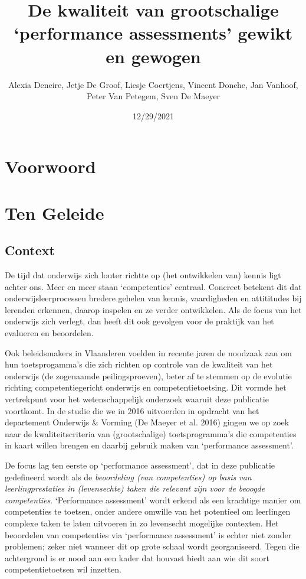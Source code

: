 \documentclass[
  letterpaper,
]{report}
\title{De kwaliteit van grootschalige `performance assessments' gewikt
en gewogen}
\author{Alexia Deneire, Jetje De Groof, Liesje Coertjens, Vincent
Donche, Jan Vanhoof, Peter Van Petegem, Sven De Maeyer}
\date{12/29/2021}
\begin{document}
\maketitle

\renewcommand*\contentsname{Inhoud hoofdstuk}
{
\hypersetup{linkcolor=}
\setcounter{tocdepth}{2}
\tableofcontents
}
\listoffigures
\listoftables
\hypertarget{voorwoord}{%
\chapter*{Voorwoord}\label{voorwoord}}

\hypertarget{ten-geleide}{%
\chapter{Ten Geleide}\label{ten-geleide}}

\hypertarget{context}{%
\section{Context}\label{context}}

De tijd dat onderwijs zich louter richtte op (het ontwikkelen van)
kennis ligt achter ons. Meer en meer staan `competenties' centraal.
Concreet betekent dit dat onderwijsleerprocessen bredere gehelen van
kennis, vaardigheden en attititudes bij lerenden erkennen, daarop
inspelen en ze verder ontwikkelen. Als de focus van het onderwijs zich
verlegt, dan heeft dit ook gevolgen voor de praktijk van het evalueren
en beoordelen.

Ook beleidsmakers in Vlaanderen voelden in recente jaren de noodzaak aan
om hun toetsprogamma's die zich richten op controle van de kwaliteit van
het onderwijs (de zogenaamde peilingsproeven), beter af te stemmen op de
evolutie richting competentiegericht onderwijs en competentietoetsing.
Dit vormde het vertrekpunt voor het wetenschappelijk onderzoek waaruit
deze publicatie voortkomt. In de studie die we in 2016 uitvoerden in
opdracht van het departement Onderwijs \& Vorming (De Maeyer et al.
2016) gingen we op zoek naar de kwaliteitscriteria van (grootschalige)
toetsprogramma's die competenties in kaart willen brengen en daarbij
gebruik maken van `performance assessment'.

De focus lag ten eerste op `performance assessment', dat in deze
publicatie gedefineerd wordt als de \emph{beoordeling (van competenties)
op basis van leerlingprestaties in (levensechte) taken die relevant zijn
voor de beoogde competenties}. `Performance assessment' wordt erkend als
een krachtige manier om competenties te toetsen, onder andere omwille
van het potentieel om leerlingen complexe taken te laten uitvoeren in zo
levensecht mogelijke contexten. Het beoordelen van competenties via
`performance assessment' is echter niet zonder problemen; zeker niet
wanneer dit op grote schaal wordt georganiseerd. Tegen die achtergrond
is er nood aan een kader dat houvast biedt aan wie dit soort
competentietoetsen wil inzetten.
\end{document}

